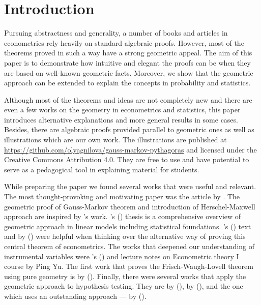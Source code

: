 \section{Introduction}

\begin{fullwidth}

Pursuing abstractness and generality, a number of books and articles in
econometrics rely heavily on standard algebraic proofs.
However, most of the theorems proved in such a way have a strong geometric appeal.
The aim of this paper is to demonstrate how intuitive and elegant the proofs
can be when they are based on well-known geometric facts.
Moreover, we show that the geometric approach can be extended to explain
the concepts in probability and statistics.

Although most of the theorems and ideas are not completely new and
there are even a few works on the geometry in econometrics and statistics,
this paper introduces alternative explanations and more general results in some cases.
Besides, there are algebraic proofs provided parallel to geometric ones
as well as illustrations which are our own work.
The illustrations are published at \url{https://github.com/olyagnilova/gauss-markov-pythagoras} and licensed under the
Creative Commons Attribution 4.0. %
They are free to use and have potential to serve as a pedagogical tool
in explaining material for students.

While preparing the paper we found several works that were useful and relevant.
The most thought-provoking and motivating paper was the article  by
\citeauthor{cobb2011teaching}.
The geometric proof of Gauss-Markov theorem and introduction of Herschel-Maxwell approach are inspired by
\citeauthor{cobb2011teaching}'s work.
\citeauthor{jacobson}'s (\citeyear{jacobson}) thesis 
is a comprehensive overview of geometric approach in linear models including
statistical foundations.
\citeauthor{gmt_blue}’s (\citeyear{gmt_blue}) text  and
 by
\citeauthor{gmt_american_statistician} (\citeyear{gmt_american_statistician}) were helpful when thinking over
the alternative way of proving this central theorem of econometrics.
The works that deepened our understanding of instrumental variables were
\citeauthor{Butler2016}'s (\citeyear{Butler2016}) 
and \href{http://web.hku.hk/~pingyu/6005/6005.htm}{lecture notes} on Econometric theory I course by Ping Yu.
The first work that proves the Frisch-Waugh-Lovell theorem using pure geometry
is  by
\citeauthor{fwl} (\citeyear{fwl}).
Finally, there were several works that apply the geometric approach to
hypothesis testing. They are
by \citeauthor{Langsrud2004} (\citeyear{Langsrud2004}),
by \citeauthor{Siniksaran2005} (\citeyear{Siniksaran2005}),
and the one which uses an outstanding approach —
by \citeauthor{friendly2013} (\citeyear{friendly2013}).


\end{fullwidth}
